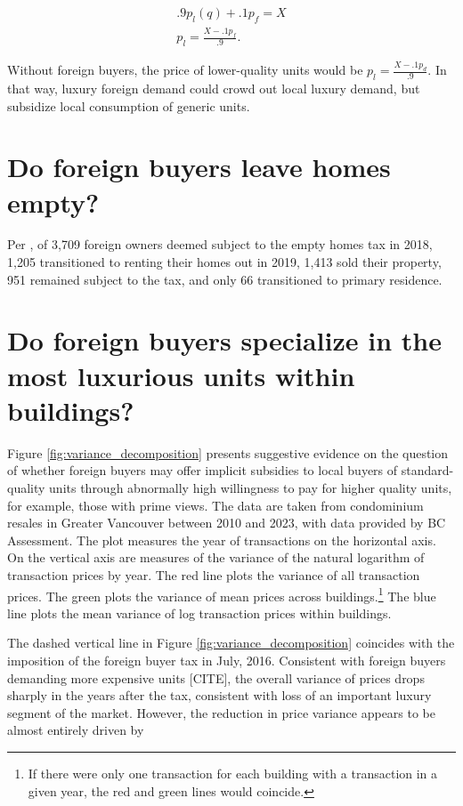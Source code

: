 \documentclass[12pt]{article}
\begin{document}
\begin{align}
	.9p_{l}(q) + .1p_{f} = X\\
	p_{l} = \frac{X - .1p_{f}}{.9}.
\end{align}

Without foreign buyers, the price of lower-quality units would be $p_{l} =
\frac{X-.1p_{d}}{.9}$. In that way, luxury foreign demand could crowd out local
luxury demand, but subsidize local consumption of generic units.

\section{Do foreign buyers leave homes empty?}

Per \textcite{specTax2019}, of 3,709 foreign owners deemed subject
to the empty homes tax in 2018, 1,205 transitioned to renting their homes out
in 2019, 1,413 sold their property, 951 remained subject to the tax, and only
66 transitioned to primary residence. 

\section{Do foreign buyers specialize in the most luxurious units within buildings?}

Figure \ref{fig:variance_decomposition} presents suggestive evidence on the question of
whether foreign buyers may offer implicit subsidies to local buyers of
standard-quality units through abnormally high willingness to pay for higher
quality units, for example, those with prime views. The data are taken from
condominium resales in Greater Vancouver between 2010 and 2023, with data
provided by BC Assessment. The plot measures the year of transactions on the
horizontal axis. On the vertical axis are measures of the variance of the
natural logarithm of transaction prices by year. The red line plots the
variance of all transaction prices. The green plots the variance of mean prices
across buildings.\footnote{If there were only one transaction for each building
with a transaction in a given year, the red and green lines would coincide.}
The blue line plots the mean variance of log transaction prices within
buildings. 

The dashed vertical line in Figure \ref{fig:variance_decomposition} coincides
with the imposition of the foreign buyer tax in July, 2016. Consistent with
foreign buyers demanding more expensive units [CITE], the overall variance of
prices drops sharply in the years after the tax, consistent with loss of an important luxury
segment of the market. However, the reduction in price variance appears to be
almost entirely driven by
\end{document}
